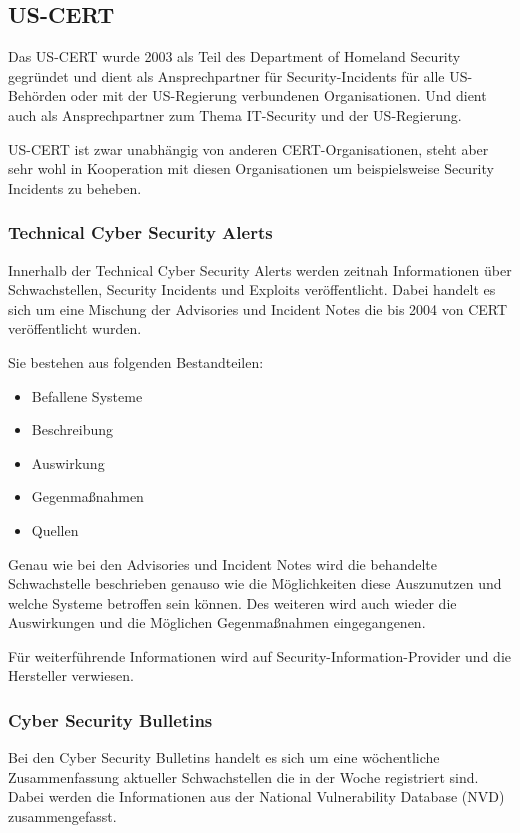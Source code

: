 \subsection{US-CERT} Das US-CERT wurde 2003 als Teil des Department of
Homeland Security gegründet und dient als Ansprechpartner für
Security-Incidents für alle US-Behörden oder mit der US-Regierung
verbundenen Organisationen. Und dient auch als Ansprechpartner zum
Thema IT-Security und der US-Regierung.

US-CERT ist zwar unabhängig von anderen CERT-Organisationen, steht
aber sehr wohl in Kooperation mit diesen Organisationen um
beispielsweise Security Incidents zu beheben.

\subsubsection{Technical Cyber Security Alerts} Innerhalb der
Technical Cyber Security Alerts werden zeitnah Informationen über
Schwachstellen, Security Incidents und Exploits veröffentlicht. Dabei
handelt es sich um eine Mischung der Advisories und Incident Notes die
bis 2004 von CERT veröffentlicht wurden.

Sie bestehen aus folgenden Bestandteilen:\\
\begin{itemize}
 \item Befallene Systeme
 \item Beschreibung
 \item Auswirkung
 \item Gegenmaßnahmen
 \item Quellen
\end{itemize}

Genau wie bei den Advisories und Incident Notes wird die behandelte
Schwachstelle beschrieben genauso wie die Möglichkeiten diese
Auszunutzen und welche Systeme betroffen sein können.  Des weiteren
wird auch wieder die Auswirkungen und die Möglichen Gegenmaßnahmen
eingegangenen.

Für weiterführende Informationen wird auf
Security-Information-Provider und die Hersteller verwiesen.

\subsubsection{Cyber Security Bulletins} Bei den Cyber Security
Bulletins handelt es sich um eine wöchentliche Zusammenfassung
aktueller Schwachstellen die in der Woche registriert sind. Dabei
werden die Informationen aus der National Vulnerability Database (NVD)
zusammengefasst.

